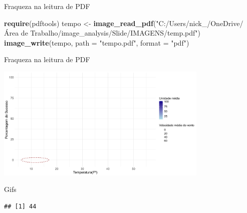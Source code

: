 \documentclass[
  ignorenonframetext,
]{beamer}
\newenvironment{Shaded}{\begin{snugshade}}{\end{snugshade}}
\newcommand{\DataTypeTok}[1]{\textcolor[rgb]{0.13,0.29,0.53}{#1}}
\newcommand{\KeywordTok}[1]{\textcolor[rgb]{0.13,0.29,0.53}{\textbf{#1}}}
\newcommand{\NormalTok}[1]{#1}
\newcommand{\OperatorTok}[1]{\textcolor[rgb]{0.81,0.36,0.00}{\textbf{#1}}}
\newcommand{\StringTok}[1]{\textcolor[rgb]{0.31,0.60,0.02}{#1}}
\begin{document}
\begin{frame}[fragile]{Fraqueza na leitura de PDF}
\protect\hypertarget{fraqueza-na-leitura-de-pdf}{}

\begin{Shaded}
\begin{Highlighting}[]
\KeywordTok{require}\NormalTok{(pdftools)}
\NormalTok{tempo <-}\StringTok{ }\KeywordTok{image_read_pdf}\NormalTok{(}\StringTok{"C:/Users/nick_/OneDrive/Área de Trabalho/image_analysis/Slide/IMAGENS/temp.pdf"}\NormalTok{)}
\KeywordTok{image_write}\NormalTok{(tempo, }\DataTypeTok{path =} \StringTok{"tempo.pdf"}\NormalTok{, }\DataTypeTok{format =} \StringTok{"pdf"}\NormalTok{)}
\end{Highlighting}
\end{Shaded}

\end{frame}

\begin{frame}{Fraqueza na leitura de PDF}
\protect\hypertarget{fraqueza-na-leitura-de-pdf-1}{}

\small

\includegraphics[width=4.0in]{tempo}

\begin{center}
\tiny{}
\end{center}

\end{frame}

\begin{frame}[fragile]{Gifs}
\protect\hypertarget{gifs}{}

\begin{Shaded}
\end{Shaded}

\begin{verbatim}
## [1] 44
\end{verbatim}

\end{frame}
\end{document}
